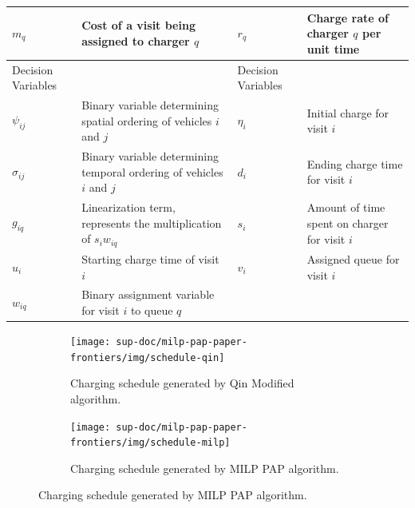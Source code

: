 \documentclass[ee,thesis]{usuthesis}
\begin{document}
\begin{table}[htbp]
\begin{tabularx}{\textwidth}{L{0.3} L{1.2} L{0.3} L{1.2}}
\(m_q\) & Cost of a visit being assigned to charger \(q\) & \(r_q\) & Charge rate of charger \(q\) per unit time\\[0pt]
\hline
Decision Variables &  & Decision Variables & \\[0pt]
\(\psi_{ij}\) & Binary variable determining spatial ordering of vehicles \(i\) and \(j\) & \(\eta_i\) & Initial charge for visit \(i\)\\[0pt]
\(\sigma_{ij}\) & Binary variable determining temporal ordering of vehicles \(i\) and \(j\) & \(d_i\) & Ending charge time for visit \(i\)\\[0pt]
\(g_{iq}\) & Linearization term, represents the multiplication of \(s_i w_{iq}\) & \(s_i\) & Amount of time spent on charger for visit \(i\)\\[0pt]
\(u_i\) & Starting charge time of visit \(i\) & \(v_i\) & Assigned queue for visit \(i\)\\[0pt]
\(w_{iq}\) & Binary assignment variable for visit \(i\) to queue \(q\) &  & \\[0pt]
\hline
\end{tabularx}
\end{table}

\begin{figure}
    \begin{subfigure}[t]{\textwidth}
    \centering
    \texttt{[image: sup-doc/milp-pap-paper-frontiers/img/schedule-qin]}
        \caption{Charging schedule generated by Qin Modified algorithm.}
        \label{subfig:qin-schedule}
    \end{subfigure}

    \begin{subfigure}[t]{\textwidth}
    \centering
        \texttt{[image: sup-doc/milp-pap-paper-frontiers/img/schedule-milp]}
        \caption{Charging schedule generated by MILP PAP algorithm.}
        \label{subfig:milp-schedule}
    \end{subfigure}
\end{figure}
\end{document}
